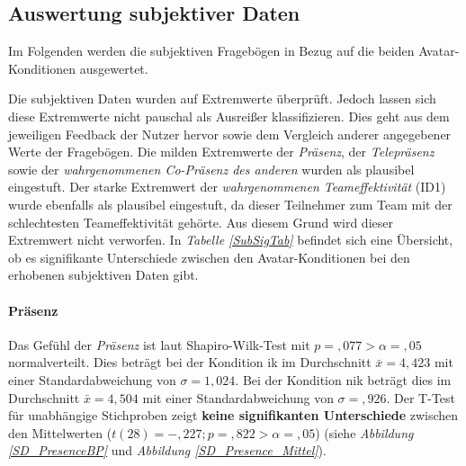 \documentclass[a4paper,11pt]{article}%
\renewcommand{\\}{\vspace*{0.5\baselineskip} \newline}
\begin{document}
{%

\newpage
\subsection{Auswertung subjektiver Daten}
Im Folgenden werden die subjektiven Fragebögen in Bezug auf die beiden Avatar-Konditionen ausgewertet.

Die subjektiven Daten wurden auf Extremwerte überprüft. Jedoch lassen sich diese Extremwerte nicht pauschal als Ausreißer klassifizieren. Dies geht aus dem jeweiligen Feedback der Nutzer hervor sowie dem Vergleich anderer angegebener Werte der Fragebögen. Die milden Extremwerte der \textit{Präsenz}, der \textit{Telepräsenz} sowie der \textit{wahrgenommenen Co-Präsenz des anderen} wurden als plausibel eingestuft. 
Der starke Extremwert der \textit{wahrgenommenen Teameffektivität} (ID1) wurde ebenfalls als plausibel eingestuft, da dieser Teilnehmer zum Team mit der schlechtesten Teameffektivität gehörte. Aus diesem Grund wird dieser Extremwert nicht verworfen.
In \textit{Tabelle \ref{SubSigTab}} befindet sich eine Übersicht, ob es signifikante Unterschiede zwischen den Avatar-Konditionen bei den erhobenen subjektiven Daten gibt.

\paragraph{Präsenz}
Das Gefühl der \textit{Präsenz} ist laut Shapiro-Wilk-Test mit $p =,077 > \alpha = ,05$ normalverteilt. 
Dies beträgt bei der Kondition \ac{ik} im Durchschnitt $\bar{x} = 4,423$ mit einer Standardabweichung von $\sigma = 1,024$.
Bei der Kondition \ac{nik} beträgt dies im Durchschnitt $\bar{x} = 4,504$ mit einer Standardabweichung von $\sigma =,926$.
Der T-Test für unabhängige Stichproben zeigt \textbf{keine signifikanten Unterschiede} zwischen den Mittelwerten ($t(28) = -,227; p =,822 > \alpha = ,05$) (siehe \textit{Abbildung \ref{SD_PresenceBP}} und \textit{Abbildung \ref{SD_Presence_Mittel}}).

}
\end{document}
